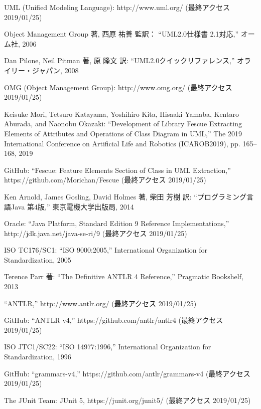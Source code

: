\documentclass[uplatex, report, a4j, 10pt]{jsbook}
\begin{document}
\begin{thebibliography}{99}
  
   UML (Unified Modeling Language): http://www.uml.org/ (最終アクセス 2019/01/25)
  
   Object Management Group 著, 西原 祐善 監訳： ``UML2.0仕様書 2.1対応,'' オーム社, 2006
  
   Dan Pilone, Neil Pitman 著, 原 隆文 訳: ``UML2.0クイックリファレンス,'' オライリー・ジャパン, 2008
  
   OMG (Object Management Group): http://www.omg.org/ (最終アクセス 2019/01/25)
  
  
   Keisuke Mori, Tetsuro Katayama, Yoshihiro Kita, Hisaaki Yamaba, Kentaro Aburada, and Naonobu Okazaki: ``Development of Library Fescue Extracting Elements of Attributes and Operations of Class Diagram in UML,'' The 2019 International Conference on Artificial Life and Robotics (ICAROB2019), pp. 165--168, 2019
  
   GitHub: ``Fescue: Feature Elements Section of Class in UML Extraction,'' https://github.com/Morichan/Fescue (最終アクセス 2019/01/25)
  
  
   Ken Arnold, James Gosling, David Holmes 著, 柴田 芳樹 訳: ``プログラミング言語Java 第4版,'' 東京電機大学出版局, 2014
  
   Oracle: ``Java Platform, Standard Edition 9 Reference Implementations,'' http://jdk.java.net/java-se-ri/9 (最終アクセス 2019/01/25)
  
   ISO TC176/SC1: ``ISO 9000:2005,'' International Organization for Standardization, 2005
  
   Terence Parr 著: ``The Definitive ANTLR 4 Reference,'' Pragmatic Bookshelf, 2013
  
   ``ANTLR,'' http://www.antlr.org/ (最終アクセス 2019/01/25)
  
   GitHub: ``ANTLR v4,'' https://github.com/antlr/antlr4 (最終アクセス 2019/01/25)
  
   ISO JTC1/SC22: ``ISO 14977:1996,'' International Organization for Standardization, 1996
  
   GitHub: ``grammars-v4,'' https://github.com/antlr/grammars-v4 (最終アクセス 2019/01/25)
  
   The JUnit Team: JUnit 5, https://junit.org/junit5/ (最終アクセス 2019/01/25)
  

\end{thebibliography}
\end{document}
